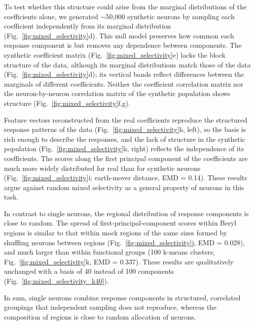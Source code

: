 \documentclass[10pt,lineno]{elife}
\begin{document}
To test whether this structure could arise from the marginal distributions of the coefficients alone, we generated $\sim$50,000 synthetic neurons by sampling each coefficient independently from its marginal distribution (Fig.~\ref{fig:mixed_selectivity}d). This null model preserves how common each response component is but removes any dependence between components. The synthetic coefficient matrix (Fig.~\ref{fig:mixed_selectivity}e) lacks the block structure of the data, although its marginal distributions match those of the data (Fig.~\ref{fig:mixed_selectivity}d); its vertical bands reflect differences between the marginals of different coefficients. Neither the coefficient correlation matrix nor the neuron-by-neuron correlation matrix of the synthetic population shows structure (Fig.~\ref{fig:mixed_selectivity}f,g).

Feature vectors reconstructed from the real coefficients reproduce the structured response patterns of the data (Fig.~\ref{fig:mixed_selectivity}h, left), so the basis is rich enough to describe the responses, and the lack of structure in the synthetic population (Fig.~\ref{fig:mixed_selectivity}h, right) reflects the independence of its coefficients. The scores along the first principal component of the coefficients are much more widely distributed for real than for synthetic neurons (Fig.~\ref{fig:mixed_selectivity}i; earth-mover distance, EMD = 0.14). These results argue against random mixed selectivity as a general property of neurons in this task.

In contrast to single neurons, the regional distribution of response components is close to random. The spread of first-principal-component scores within Beryl regions is similar to that within mock regions of the same sizes formed by shuffling neurons between regions (Fig.~\ref{fig:mixed_selectivity}j, EMD = 0.028), and much larger than within functional groups (100 k-means clusters; Fig.~\ref{fig:mixed_selectivity}k, EMD = 0.337). These results are qualitatively unchanged with a basis of 40 instead of 100 components (Fig.~\ref{fig:mixed_selectivity_k40}).

In sum, single neurons combine response components in structured, correlated groupings that independent sampling does not reproduce, whereas the composition of regions is close to random allocation of neurons.
\end{document}

